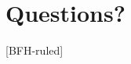 \documentclass[
    ngerman,%
    authorontitle=true,
]{bfhbeamer}
\begin{document}
    \section{Questions?}
    [BFH-ruled]
    \frame{\sectionpage}








\end{document}
